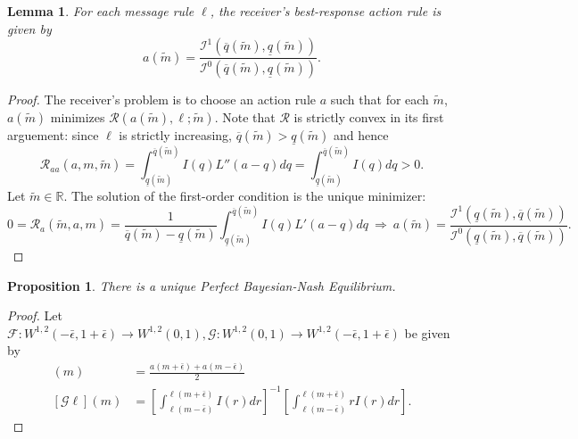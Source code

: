 \documentclass[12pt]{article}
\newtheorem{lemma}{Lemma}
\newtheorem{proposition}{Proposition}
\begin{document}
\begin{lemma}
For each message rule $\ell$, the receiver's best-response action rule is given by
\begin{equation}
a(\tilde{m})=\frac{\mathcal{I}^{1}(\overline{q}(\tilde{m}),\underline{q}(\tilde{m}))}{\mathcal{I}^{0}(\overline{q}(\tilde{m}),\underline{q}(\tilde{m}))}.
\end{equation}
\end{lemma}
\begin{proof}
The receiver's problem is to choose an action rule $a$ such that for each $\tilde{m}$, $a(\tilde{m})$ minimizes $\mathcal{R}(a(\tilde{m}),\ell;\tilde{m})$. Note that $\mathcal{R}$ is strictly convex in its first arguement: since $\ell$ is strictly increasing, $\overline{q}(\tilde{m})>\underline{q}(\tilde{m})$ and hence
\begin{equation}
\mathcal{R}_{aa}(a,m,\tilde{m})=\int_{\underline{q}(\tilde{m})}^{\overline{q}(\tilde{m})}{I(q)L''(a-q)dq}=\int_{\underline{q}(\tilde{m})}^{\overline{q}(\tilde{m})}{I(q)dq}>0.
\end{equation}
Let $\tilde{m}\in\mathbb{R}$. The solution of the first-order condition is the unique minimizer:
\begin{equation}
0=\mathcal{R}_{a}(\tilde{m},a,m)=\frac{1}{\overline{q}(\tilde{m})-\underline{q}(\tilde{m})}\int_{\underline{q}(\tilde{m})}^{\overline{q}(\tilde{m})}{I(q)L'(a-q)dq}\:\Rightarrow\:a(\tilde{m})=\frac{\mathcal{I}^{1}(\underline{q}(\tilde{m}),\overline{q}(\tilde{m}))}{\mathcal{I}^{0}(\underline{q}(\tilde{m}),\overline{q}(\tilde{m}))}.
\end{equation}
\end{proof}

\begin{proposition}
There is a unique Perfect Bayesian-Nash Equilibrium.
\end{proposition}
\begin{proof}
Let $\mathcal{F}:W^{1,2}(-\bar{\epsilon},1+\bar{\epsilon})\rightarrow W^{1,2}(0,1), \mathcal{G}:W^{1,2}(0,1)\rightarrow W^{1,2}(-\bar{\epsilon},1+\bar{\epsilon})$ be given by
\begin{align}
[\mathcal{F}a](m)&=\frac{a(m+\bar{\epsilon})+a(m-\bar{\epsilon})}{2}\\
[\mathcal{G}\ell](m)&=\left[\int_{\ell(m-\bar{\epsilon})}^{\ell(m+\bar{\epsilon})}{I(r)dr}\right]^{-1}\left[\int_{\ell(m-\bar{\epsilon})}^{\ell(m+\bar{\epsilon})}{rI(r)dr}\right].
\end{align}
\end{proof}
\end{document}
